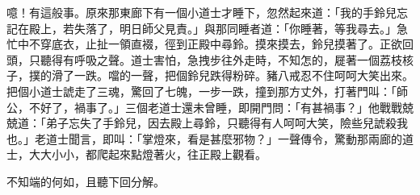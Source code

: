 噫！有這般事。原來那東廊下有一個小道士才睡下，忽然起來道：「我的手鈴兒忘記在殿上，若失落了，明日師父見責。」與那同睡者道：「你睡著，等我尋去。」急忙中不穿底衣，止扯一領直裰，徑到正殿中尋鈴。摸來摸去，鈴兒摸著了。正欲回頭，只聽得有呼吸之聲。道士害怕，急拽步往外走時，不知怎的，屣著一個荔枝核子，撲的滑了一跌。噹的一聲，把個鈴兒跌得粉碎。豬八戒忍不住呵呵大笑出來。把個小道士諕走了三魂，驚回了七魄，一步一跌，撞到那方丈外，打著門叫：「師公，不好了，禍事了。」三個老道士還未曾睡，即開門問：「有甚禍事？」他戰戰兢兢道：「弟子忘失了手鈴兒，因去殿上尋鈴，只聽得有人呵呵大笑，險些兒諕殺我也。」老道士聞言，即叫：「掌燈來，看是甚麼邪物？」一聲傳令，驚動那兩廊的道士，大大小小，都爬起來點燈著火，往正殿上觀看。

不知端的何如，且聽下回分解。
